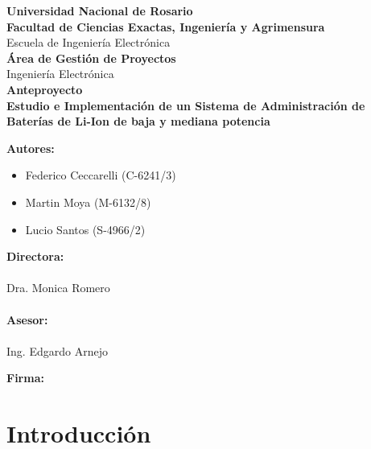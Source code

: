 \documentclass[10pt,a4paper]{article}
\begin{document}
\begin{titlepage}
\begin{center}
 \large{ \textbf{Universidad Nacional de Rosario}} \\[5mm]
 \textbf{Facultad de Ciencias Exactas, Ingeniería y Agrimensura} \\[5mm]
 Escuela de Ingeniería Electrónica \\[20mm]
 \Large {\textbf{Área de Gestión de Proyectos}}\\[1.5mm]
 \small {Ingeniería Electrónica} \\[20mm]
 \Large {\textbf{Anteproyecto}} \\[5mm]
 \Large{ \textbf{Estudio e Implementación de un Sistema de Administración de Baterías de Li-Ion de baja y mediana potencia}} \\[15mm]

\end{center}
\begin{minipage}[t]{0.5\textwidth}
	{\large\textbf{Autores:}}
	\begin{itemize}
		\item Federico Ceccarelli (C-6241/3)
		\item Martin Moya (M-6132/8)
		\item Lucio Santos (S-4966/2)
	\end{itemize}
\vspace{10pt}
{\large\textbf{Directora:}}\\
\\
Dra. Monica Romero\\
\\
{\large\textbf{Asesor:}}\\
\\
Ing. Edgardo Arnejo


\end{minipage}
\begin{minipage}[t]{0.5\textwidth}
	\Large\textbf{Firma:}
\end{minipage}


\end{titlepage}

\tableofcontents

\clearpage

\section{Introducción}
\end{document}
